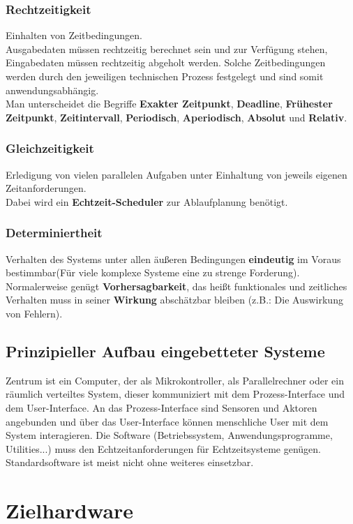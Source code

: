 \documentclass[a4paper, 10 pt, conference]{ieeeconf}
\begin{document}
\subsubsection*{\textbf{Rechtzeitigkeit}}
Einhalten von Zeitbedingungen. \\
Ausgabedaten müssen rechtzeitig berechnet sein und zur Verfügung stehen, Eingabedaten müssen rechtzeitig abgeholt werden. Solche Zeitbedingungen werden durch den jeweiligen technischen Prozess festgelegt und sind somit anwendungsabhängig. \\
Man unterscheidet die Begriffe \textbf{Exakter Zeitpunkt}, \textbf{Deadline}, \textbf{Frühester Zeitpunkt}, \textbf{Zeitintervall}, \textbf{Periodisch}, \textbf{Aperiodisch}, \textbf{Absolut} und \textbf{Relativ}. 
\subsubsection*{\textbf{Gleichzeitigkeit}}
Erledigung von vielen parallelen Aufgaben unter Einhaltung von jeweils eigenen Zeitanforderungen. \\
Dabei wird ein \textbf{Echtzeit-Scheduler} zur Ablaufplanung benötigt. 
\subsubsection*{\textbf{Determiniertheit}}
Verhalten des Systems unter allen äußeren Bedingungen  \textbf{eindeutig} im Voraus bestimmbar(Für viele komplexe Systeme  eine zu strenge Forderung). Normalerweise genügt \textbf{Vorhersagbarkeit}, das heißt funktionales und zeitliches Verhalten muss in seiner \textbf{Wirkung} abschätzbar bleiben (z.B.: Die Auswirkung von Fehlern). 


\subsection*{\textbf{Prinzipieller Aufbau eingebetteter Systeme}}
Zentrum ist ein Computer, der als Mikrokontroller, als Parallelrechner oder ein räumlich verteiltes System, dieser kommuniziert mit dem Prozess-Interface und dem User-Interface. An das Prozess-Interface sind Sensoren und Aktoren angebunden und über das User-Interface können menschliche User mit dem System interagieren. Die Software (Betriebssystem, Anwendungsprogramme, Utilities...) muss den Echtzeitanforderungen für Echtzeitsysteme genügen. 
Standardsoftware ist meist nicht ohne weiteres einsetzbar. 

\pagebreak

\section{\textbf{Zielhardware}}
\end{document}
